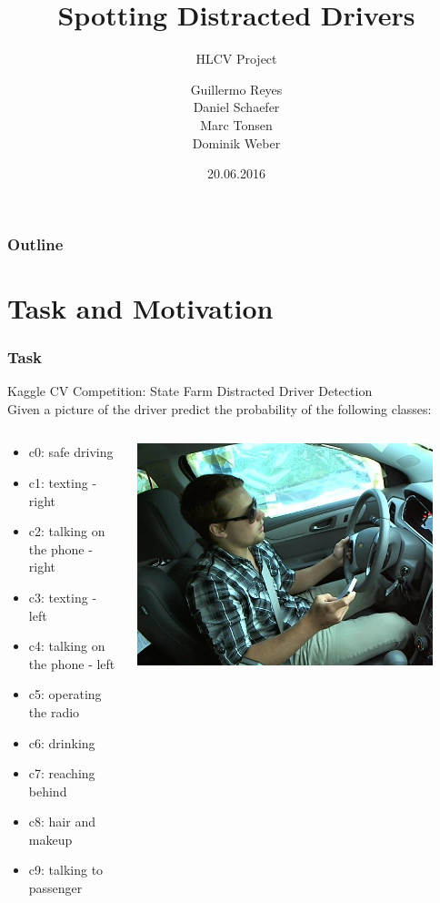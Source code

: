 \documentclass{beamer}
\title{Spotting Distracted Drivers}
\subtitle{HLCV Project}
\author[Reyes, Schaefer, Tonsen, Weber]{Guillermo Reyes \\
	 Daniel Schaefer \\
	 Marc Tonsen \\
 Dominik Weber\\}
\institute[]{Saarland University}
\date{20.06.2016}
\begin{document}
	\begin{frame}
		\titlepage
	\end{frame}
	
	\begin{frame}
		\frametitle{Outline}
		\tableofcontents
	\end{frame}
	
	\section{Task and Motivation}	
	\begin{frame}
		\frametitle{Task}
		Kaggle CV Competition: State Farm Distracted Driver Detection \\
		Given a picture of the driver predict the probability of the following classes:
		\begin{columns}
			\begin{column}{0.5\textwidth}
				\begin{itemize}
					\item c0: safe driving
					\item c1: texting - right
					\item c2: talking on the phone - right
					\item c3: texting - left
					\item c4: talking on the phone - left
					\item c5: operating the radio
					\item c6: drinking
					\item c7: reaching behind
					\item c8: hair and makeup
					\item c9: talking to passenger			
				\end{itemize}
			\end{column}
			\begin{column}{0.5\textwidth}  %
				\begin{center}
					\includegraphics[width=0.9\textwidth]{img_6}
				\end{center}
			\end{column}
		\end{columns}
		
	\end{frame}
	
\end{document}
